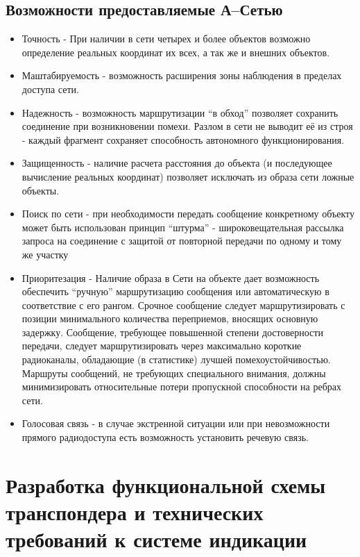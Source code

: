 \documentclass[a4paper,12pt]{report} %
\begin{document}
\section{Возможности предоставляемые А--Сетью}

\begin{itemize}
\item Точность - При наличии в сети четырех и более объектов возможно
  определение реальных координат их всех, а так же и внешних объектов. 
\item Маштабируемость - возможность расширения зоны наблюдения в пределах
  доступа сети.
\item Надежность - возможность маршрутизации ``в обход'' позволяет сохранить
  соединение при возникновении помехи. Разлом в сети не выводит её из строя -
  каждый фрагмент сохраняет способность автономного функционирования.
\item Защищенность - наличие расчета расстояния до объекта (и последующее
  вычисление реальных координат) позволяет исключать из образа сети ложные
  объекты.
\item Поиск по сети - при необходимости передать сообщение конкретному объекту
  может быть использован принцип ``штурма'' - широковещательная рассылка запроса
  на соединение с защитой от повторной передачи по одному и тому же участку
\item Приоритезация - Наличие образа в Сети на объекте дает возможность
  обеспечить ``ручную'' маршрутизацию сообщения или автоматическую в
  соответствие с его рангом. Срочное сообщение следует маршрутизировать с
  позиции минимального количества переприемов,  вносящих основную задержку.
  Сообщение, требующее повышенной степени достоверности передачи, следует
  маршрутизировать через максимально короткие радиоканалы, обладающие (в
  статистике) лучшей помехоустойчивостью. Маршруты сообщений, не требующих
  специального внимания, должны минимизировать относительные потери пропускной
  способности на ребрах сети. 
\item Голосовая связь - в случае экстренной ситуации или при невозможности
  прямого радиодоступа есть возможность установить речевую связь.
\end{itemize}
\newpage

\chapter{Разработка функциональной схемы транспондера и технических требований к
  системе индикации} %
\end{document}
